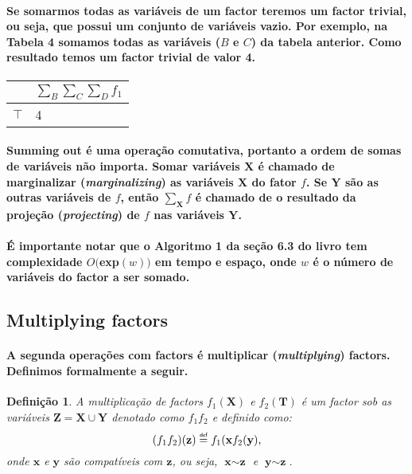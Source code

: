 \documentclass[a4paper,10pt]{article}
\newcommand\defeq{\mathrel{\overset{\makebox[0pt]{\mbox{\normalfont\tiny\sffamily def}}}{=}}}
\theoremstyle{plain}
\newtheorem*{spn-def}{Definição}
\begin{document}
\paragraph{
  Se somarmos todas as variáveis de um factor teremos um factor trivial, ou seja, que possui um
conjunto de variáveis vazio. Por exemplo, na Tabela 4 somamos todas as variáveis ($B$ e $C$) da
tabela anterior. Como resultado temos um factor trivial de valor 4.
}

\begin{table}[h]
\begin{center}
\begin{tabular}{c | l}
  & $\sum_B \sum_C \sum_D f_1$ \\
  \hline
  $\top$ & 4 \\
\end{tabular}
\end{center}
\end{table}

\paragraph{
  Summing out é uma operação comutativa, portanto a ordem de somas de variáveis não importa. Somar
variáveis $\textbf{X}$ é chamado de marginalizar (\textit{marginalizing}) as variáveis $\textbf{X}$
do fator $f$. Se $\textbf{Y}$ são as outras variáveis de $f$, então $\sum_{\textbf{X}} f$ é chamado
de o resultado da projeção (\textit{projecting}) de $f$ nas variáveis $\textbf{Y}$.
}

\paragraph{
  É importante notar que o Algoritmo 1 da seção 6.3 do livro tem complexidade $O($exp$(w))$ em 
tempo e espaço, onde $w$ é o número de variáveis do factor a ser somado.
}

\subsection{Multiplying factors}

\paragraph{
  A segunda operações com factors é multiplicar (\textit{multiplying}) factors. Definimos 
formalmente a seguir.
}

\begin{spn-def} A multiplicação de factors $f_1(\textbf{X})$ e $f_2(\textbf{T})$ é um factor sob
  as variáveis $\textbf{Z} = \textbf{X} \cup \textbf{Y}$ denotado como $f_1f_2$ e definido como:
  \begin{equation}
    (f_1f_2)(\textbf{z}) \defeq f_1(\textbf{x}f_2(\textbf{y}),
  \end{equation}
  onde $\textbf{x}$ e $\textbf{y}$ são compatíveis\cite{report-1} com $\textbf{z}$, ou seja, 
  $\textbf{x} \sim  \textbf{z}$ e $\textbf{y} \sim \textbf{z}$.
\end{spn-def}
\end{document}
